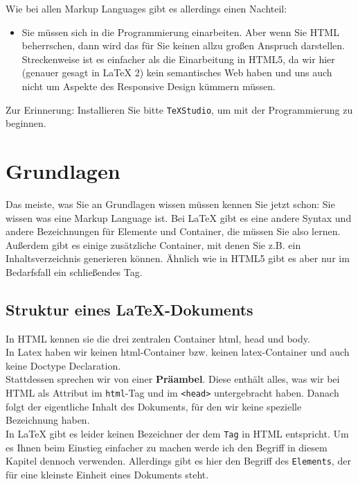 Wie bei allen Markup Languages gibt es allerdings einen Nachteil:

\begin{itemize}
	\item Sie müssen sich in die Programmierung einarbeiten. Aber wenn Sie HTML beherrschen, dann wird das für Sie keinen allzu großen Anspruch darstellen. Streckenweise ist es einfacher als die Einarbeitung in HTML5, da wir hier (genauer gesagt in LaTeX 2) kein semantisches Web haben und uns auch nicht um Aspekte des Responsive Design kümmern müssen.
\end{itemize}

Zur Erinnerung: Installieren Sie bitte \verb|TeXStudio|, um mit der Programmierung zu beginnen.

\section{Grundlagen}

Das meiste, was Sie an Grundlagen wissen müssen kennen Sie jetzt schon: Sie wissen was eine Markup Language ist. Bei LaTeX gibt es eine andere Syntax und andere Bezeichnungen für Elemente und Container, die müssen Sie also lernen. Außerdem gibt es einige zusätzliche Container, mit denen Sie z.B. ein Inhaltsverzeichnis generieren können. Ähnlich wie in HTML5 gibt es aber nur im Bedarfsfall ein schließendes Tag.\\

\subsection{Struktur eines LaTeX-Dokuments}

In HTML kennen sie die drei zentralen Container html, head und body.\\

In Latex haben wir keinen html-Container bzw. keinen latex-Container und auch keine Doctype Declaration.\\

Stattdessen sprechen wir von einer \textbf{Präambel}. Diese enthält alles, was wir bei HTML als Attribut im \verb|html|-Tag und im \verb|<head>| untergebracht haben. Danach folgt der eigentliche Inhalt des Dokuments, für den wir keine spezielle Bezeichnung haben.\\

In LaTeX gibt es leider keinen Bezeichner der dem \verb|Tag| in HTML entspricht. Um es Ihnen beim Einstieg einfacher zu machen werde ich den Begriff in diesem Kapitel dennoch verwenden. Allerdings gibt es hier den Begriff des \verb|Elements|, der für eine kleinste Einheit eines Dokuments steht.

